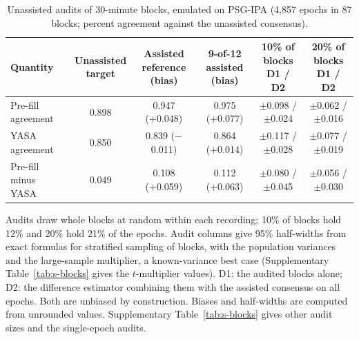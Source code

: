 \begin{table}[tbp]
\centering
\footnotesize
\caption{Unassisted audits of 30-minute blocks, emulated on PSG-IPA (4{,}857 epochs in 87 blocks; percent agreement against the unassisted consensus).}
\label{tab:remedy}
\begin{adjustbox}{max width=\linewidth}
\begin{tabular}{lccccc}
\toprule
Quantity & \makecell{Unassisted\\target} & \makecell{Assisted reference\\(bias)} & \makecell{9-of-12 assisted\\(bias)} & \makecell{10\% of blocks\\D1 / D2} & \makecell{20\% of blocks\\D1 / D2} \\
\midrule
Pre-fill agreement & 0.898 & 0.947 (+0.048) & 0.975 (+0.077) & $\pm$0.098 / $\pm$0.024 & $\pm$0.062 / $\pm$0.016 \\
YASA agreement & 0.850 & 0.839 (\ensuremath{-}0.011) & 0.864 (+0.014) & $\pm$0.117 / $\pm$0.028 & $\pm$0.077 / $\pm$0.019 \\
Pre-fill minus YASA & 0.049 & 0.108 (+0.059) & 0.112 (+0.063) & $\pm$0.080 / $\pm$0.045 & $\pm$0.056 / $\pm$0.030 \\
\bottomrule
\end{tabular}
\end{adjustbox}
\par\smallskip
\begin{minipage}{0.95\linewidth}\footnotesize Audits draw whole blocks at random within each recording; 10\% of blocks hold 12\% and 20\% hold 21\% of the epochs. Audit columns give 95\% half-widths from exact formulas for stratified sampling of blocks, with the population variances and the large-sample multiplier, a known-variance best case (Supplementary Table~\ref{tab:s-blocks} gives the $t$-multiplier values). D1: the audited blocks alone; D2: the difference estimator combining them with the assisted consensus on all epochs. Both are unbiased by construction. Biases and half-widths are computed from unrounded values. Supplementary Table~\ref{tab:s-blocks} gives other audit sizes and the single-epoch audits.\end{minipage}
\end{table}
